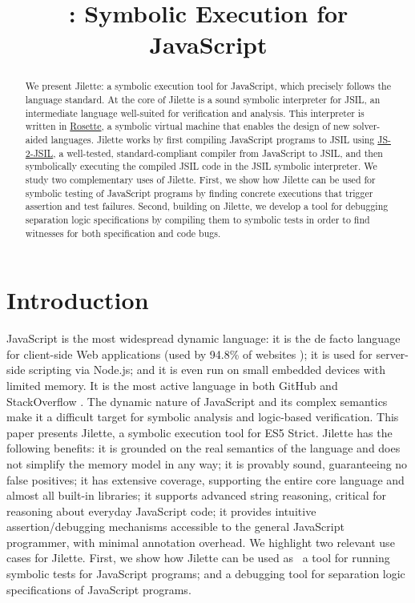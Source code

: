 \documentclass{llncs}
\title{\jilette: Symbolic Execution for JavaScript}
\author{}
\institute{}
\newcommand{\jsil}{JSIL\xspace}
\newcommand{\JSComp}{JS-2-JSIL\xspace}
\newcommand{\polish}[1]{{\color{red}#1}}
\newcommand{\jilette}{Jilette\xspace}
\begin{document}
%

\maketitle 

\vspace*{-1.4cm}
\begin{abstract}
We present \jilette: a symbolic execution tool for JavaScript, which precisely follows the language standard. At the core of \jilette is a sound symbolic interpreter for \jsil, an intermediate language well-suited for verification and analysis. This interpreter is written in \underline{Rosette}, %
a symbolic virtual machine that enables the design of new solver-aided languages. 
\jilette works by first compiling JavaScript programs to \jsil using \underline{\JSComp}, %
a well-tested, standard-compliant compiler from JavaScript to \jsil, and then symbolically executing the compiled \jsil code in the \jsil symbolic interpreter. 
We study two complementary uses of \jilette. 
First, we show how \jilette can be used for symbolic testing of JavaScript programs by finding concrete executions that trigger assertion and test failures. 
Second, building on \jilette, we develop a tool for debugging separation logic specifications
by compiling them to symbolic tests in order to find witnesses for both specification
and code bugs.
\vspace*{-0.4cm}
\end{abstract}

\section{Introduction}

\vspace*{-0.2cm}
JavaScript is the most widespread dynamic language: it is the de facto language for client-side Web applications (used by 94.8\% of websites \cite{JS948percent});
it is used for server-side scripting via Node.js; and it is even run on small embedded devices with limited 
memory. It is the most active language in both GitHub \cite{GithubActive} and StackOverflow \cite{SOActive}.
The dynamic nature of JavaScript and its complex semantics make it a difficult target for
symbolic analysis and logic-based verification. 
This paper presents \jilette, a symbolic execution tool for ES5 Strict. Jilette has the following benefits: 
 it is grounded on the real semantics of the language and does not simplify the memory model in any way; 
 \polish{it is provably sound, guaranteeing no false positives};
 it has extensive coverage, supporting the entire core language and almost all built-in libraries; 
 it supports advanced string reasoning, critical for reasoning about \polish{everyday} JavaScript code; 
 it provides \polish{intuitive assertion/debugging mechanisms} accessible to the general JavaScript programmer, with minimal annotation overhead. 
%
We highlight two relevant use cases for \jilette. First, we show how \jilette can be used as ~a tool for running symbolic tests for JavaScript programs; and  a debugging tool for separation logic specifications of JavaScript programs. 
\end{document}
